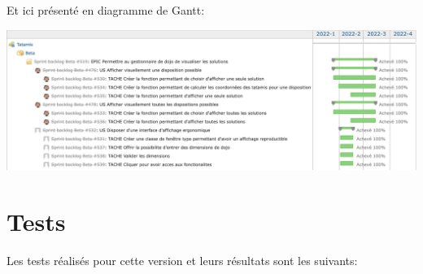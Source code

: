 \bigskip

Et ici présenté en diagramme de Gantt:

\begin{center}
    \includegraphics[width=17cm]{images/tatamis-gantt-beta.png}
\end{center}

\section{Tests}

Les tests réalisés pour cette version et leurs résultats sont les suivants:
\medskip

